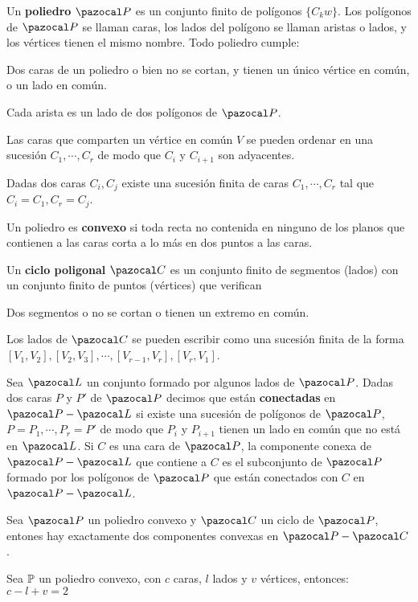  Un \textbf{poliedro} $\PP$ es un conjunto finito de polígonos $\{C_kw\}$. Los polígonos de $\PP$ se llaman caras, los lados del polígono se llaman aristas o lados, y los vértices tienen el mismo nombre. Todo poliedro cumple:
\begin{itemizex}
	\item Dos caras de un poliedro o bien no se cortan, y tienen un único vértice en común, o un lado en común.
	\item Cada arista es un lado de dos polígonos de $\PP$.
	\item Las caras que comparten un vértice en común $V$ se pueden ordenar en una sucesión $C_1, \cdots, C_r$ de modo que $C_i$ y $C_{i+1}$ son adyacentes. 
	\item Dadas dos caras $C_i, C_j$ existe una sucesión finita de caras $C_1, \cdots, C_r$ tal que $C_i = C_1, C_r = C_j$.
\end{itemizex}

 Un poliedro es \textbf{convexo} si toda recta no contenida en ninguno de los planos que contienen a las caras corta a lo más en dos puntos a las caras.

 Un \textbf{ciclo poligonal} $\C$ es un conjunto finito de segmentos (lados) con un conjunto finito de puntos (vértices) que verifican
\begin{itemizex}
	\item Dos segmentos o no se cortan o tienen un extremo en común.
	\item Los lados de $\C$ se pueden escribir como una sucesión finita de la forma $[V_1,V_2], [V_2,V_3],\cdots, [V_{r-1},V_r],[V_r,V_1]$.
\end{itemizex}

 Sea $\L$ un conjunto formado por algunos lados de $\PP$. Dadas dos caras $P$ y $P'$ de $\PP$ decimos que están \textbf{conectadas} en $\PP - \L$ si existe una sucesión de polígonos de $\PP$, $P = P_1, \cdots, P_r = P'$ de modo que $P_i$ y $P_{i+1}$ tienen un lado en común que no está en $\L$. Si $C$ es una cara de $\PP$, la componente conexa de $\PP - \L$ que contiene a $C$ es el subconjunto de $\PP$ formado por los polígonos de $\PP$ que están conectados con $C$ en $\PP-\L$.

 Sea $\PP$ un poliedro convexo y $\C$ un ciclo de $\PP$, entones hay exactamente dos componentes convexas en $\PP-\C$.

 Sea $\P$ un poliedro convexo, con $c$ caras, $l$ lados y $v$ vértices, entonces:
$c-l+v = 2$

